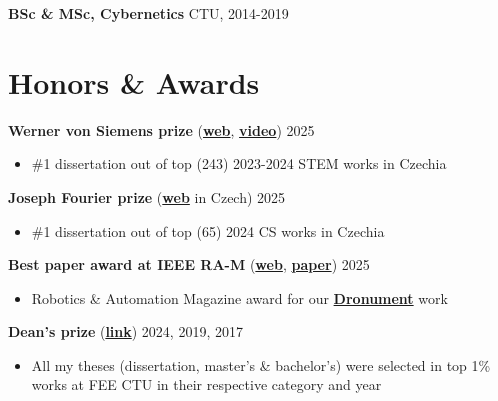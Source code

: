 \documentclass[12pt,a4paper]{article}
\newcommand\Colorhreff[3][reff]{\href{#2}{\color{#1}#3}}
\begin{document}
\begin{paracol}{2}
\vspace{0.2cm}
\noindent
\textbf{BSc \& MSc, Cybernetics} \hfill CTU, 2014-2019

\section*{Honors \& Awards}
\textbf{Werner von Siemens prize} (\Colorhreff{https://www.cenasiemens.cz/minule-rocniky/vitezove-2024/\#disertacni-prace}{\textbf{web}}, \Colorhreff{https://www.youtube.com/watch?v=idnDA4Ap-J4}{\textbf{video}}) \hfill 2025
\begin{itemize}
  \item \#1 dissertation out of top (243) 2023-2024 STEM works in Czechia
\end{itemize}

\vspace{0.2cm}
\noindent
\textbf{Joseph Fourier prize} (\Colorhreff{https://feedit.cz/2025/06/26/vymyslel-zpusob-jak-mohou-drony-letat-uvnitr-budov-mlady-cesky-vedec-za-to-ziskal-cenu-josepha-fouriera-a-staz-ve-francii/}{\textbf{web}} in Czech) \hfill 2025
\begin{itemize}
  \item \#1 dissertation out of top (65) 2024 CS works in Czechia
\end{itemize}

\vspace{0.2cm}
\noindent
\textbf{Best paper award at IEEE RA-M} (\Colorhreff{https://www.linkedin.com/posts/mrsgroupprague_icra2025-robotics-dronetechnology-activity-7332784284316962816-kg45}{\textbf{web}}, \Colorhreff{https://mrs.fel.cvut.cz/data/papers/petracek2023ram.pdf}{\textbf{paper}}) \hfill 2025
\begin{itemize}
  \item Robotics \& Automation Magazine award for our \Colorhreff{https://www.youtube.com/watch?v=Gx-mBklSbYc}{\textbf{Dronument}} work
\end{itemize}

\vspace{0.2cm}
\noindent
\textbf{Dean's prize} (\Colorhreff{https://cyber.felk.cvut.cz/news/pavel-petracek-received-the-deans-award-for-prestigious-dissertation/}{\textbf{link}}) \hfill 2024, 2019, 2017
\begin{itemize}
  \item All my theses (dissertation, master's \& bachelor's) were selected in top 1\% works at FEE CTU in their respective category and year
\end{itemize}


\end{paracol}
\end{document}
